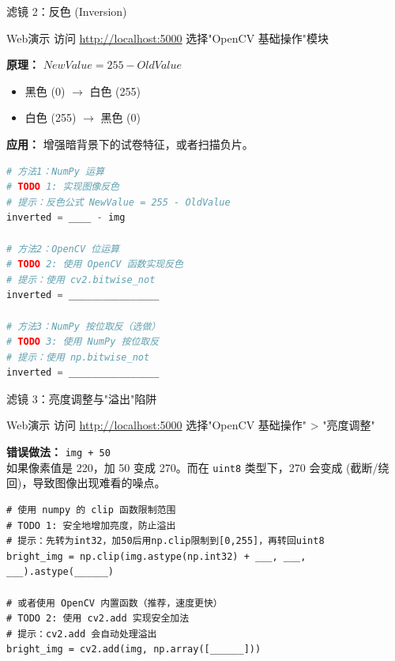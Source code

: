\begin{frame}[fragile]{滤镜 2：反色 (Inversion)}
	\begin{alertblock}{Web演示}
		访问 \url{http://localhost:5000} 选择"OpenCV 基础操作"模块
	\end{alertblock}

	\textbf{原理：} $NewValue = 255 - OldValue$
	\begin{itemize}
		\item 黑色 (0) $\to$ 白色 (255)
		\item 白色 (255) $\to$ 黑色 (0)
	\end{itemize}
	\textbf{应用：} 增强暗背景下的试卷特征，或者扫描负片。

	\begin{lstlisting}[language=Python, basicstyle=\ttfamily\small]
# 方法1：NumPy 运算
# TODO 1: 实现图像反色
# 提示：反色公式 NewValue = 255 - OldValue
inverted = ____ - img

# 方法2：OpenCV 位运算
# TODO 2: 使用 OpenCV 函数实现反色
# 提示：使用 cv2.bitwise_not
inverted = ________________

# 方法3：NumPy 按位取反（选做）
# TODO 3: 使用 NumPy 按位取反
# 提示：使用 np.bitwise_not
inverted = ________________
\end{lstlisting}
\end{frame}

\begin{frame}[fragile]{滤镜 3：亮度调整与"溢出"陷阱}
	\begin{alertblock}{Web演示}
		访问 \url{http://localhost:5000} 选择"OpenCV 基础操作" > "亮度调整"
	\end{alertblock}

	\textbf{错误做法：} \texttt{img + 50}
	\\ 如果像素值是 220，加 50 变成 270。而在 \texttt{uint8} 类型下，270 会变成  (截断/绕回)，导致图像出现难看的噪点。

	\begin{lstlisting}[title={安全写法}]
# 使用 numpy 的 clip 函数限制范围
# TODO 1: 安全地增加亮度，防止溢出
# 提示：先转为int32，加50后用np.clip限制到[0,255]，再转回uint8
bright_img = np.clip(img.astype(np.int32) + ___, ___, ___).astype(______)

# 或者使用 OpenCV 内置函数（推荐，速度更快）
# TODO 2: 使用 cv2.add 实现安全加法
# 提示：cv2.add 会自动处理溢出
bright_img = cv2.add(img, np.array([______]))
\end{lstlisting}
\end{frame}

